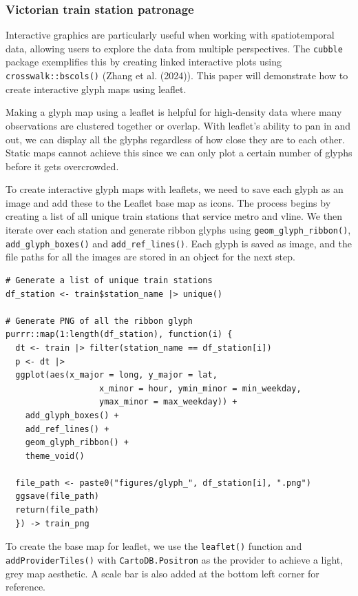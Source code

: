 \hypertarget{victorian-train-station-patronage}{%
\subsubsection{Victorian train station patronage}\label{victorian-train-station-patronage}}

Interactive graphics are particularly useful when working with spatiotemporal data, allowing users to explore the data from multiple perspectives. The \texttt{cubble} package exemplifies this by creating linked interactive plots using \texttt{crosswalk::bscols()} (Zhang et al. (2024)). This paper will demonstrate how to create interactive glyph maps using leaflet.

Making a glyph map using a leaflet is helpful for high-density data where many observations are clustered together or overlap. With leaflet's ability to pan in and out, we can display all the glyphs regardless of how close they are to each other. Static maps cannot achieve this since we can only plot a certain number of glyphs before it gets overcrowded.

To create interactive glyph maps with leaflets, we need to save each glyph as an image and add these to the Leaflet base map as icons. The process begins by creating a list of all unique train stations that service metro and vline. We then iterate over each station and generate ribbon glyphs using \texttt{geom\_glyph\_ribbon()}, \texttt{add\_glyph\_boxes()} and \texttt{add\_ref\_lines()}. Each glyph is saved as image, and the file paths for all the images are stored in an object for the next step.

\begin{verbatim}
# Generate a list of unique train stations
df_station <- train$station_name |> unique()

# Generate PNG of all the ribbon glyph
purrr::map(1:length(df_station), function(i) {
  dt <- train |> filter(station_name == df_station[i])
  p <- dt |>
  ggplot(aes(x_major = long, y_major = lat,
                   x_minor = hour, ymin_minor = min_weekday,
                   ymax_minor = max_weekday)) +
    add_glyph_boxes() +
    add_ref_lines() +
    geom_glyph_ribbon() +
    theme_void() 
  
  file_path <- paste0("figures/glyph_", df_station[i], ".png")
  ggsave(file_path)
  return(file_path)
  }) -> train_png 
\end{verbatim}

To create the base map for leaflet, we use the \texttt{leaflet()} function and \texttt{addProviderTiles()} with \texttt{CartoDB.Positron} as the provider to achieve a light, grey map aesthetic. A scale bar is also added at the bottom left corner for reference.

